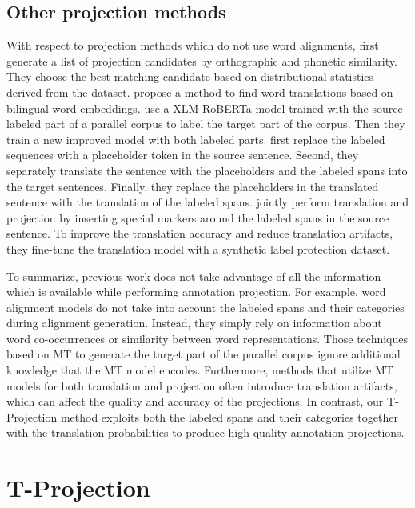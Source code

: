 \documentclass[11pt]{article}
\begin{document}
\subsection{Other projection methods}

With respect to projection methods which do not use word alignments, 
\citet{jain-etal-2019-entity} first generate a list of projection candidates by
orthographic and phonetic similarity. They choose the best matching candidate
based on distributional statistics derived from the dataset.
\citet{xie-etal-2018-neural} propose a method to find word translations based
on bilingual word embeddings. \citet{Li2021crosslingualNE} use a XLM-RoBERTa
model \cite{xlmr} trained with the source labeled part of a parallel corpus to label
the target part of the corpus. Then they train a new improved model with both
labeled parts. \citet{DBLP:journals/corr/abs-2211-09394} first
replace the labeled sequences with a placeholder token in the source sentence.
Second, they separately translate the sentence with the placeholders and the
labeled spans into the target sentences. Finally, they replace the placeholders
in the translated sentence with the translation of the labeled spans. \citet{DBLP:journals/corr/abs-2211-15613} jointly perform translation and projection by inserting special markers around the labeled spans in the source sentence. To improve the translation accuracy and reduce translation artifacts, they fine-tune the translation model with a synthetic label protection dataset. 

To summarize, previous work does not take advantage of all the 
information which is available while performing annotation projection. For example, word alignment
models do not take into account the labeled spans
and their categories during alignment generation. Instead, they simply rely on information about word
co-occurrences or similarity between word representations. Those
techniques based on MT to generate the target part of the
parallel corpus ignore additional knowledge that the MT model
encodes. Furthermore, methods that utilize MT models for both translation and projection often introduce translation artifacts, which can affect the quality and accuracy of the projections. In contrast, our T-Projection method exploits both the labeled spans and
their categories together with the translation probabilities to produce
high-quality annotation projections.

\section{T-Projection}\label{sec:method}
\end{document}
